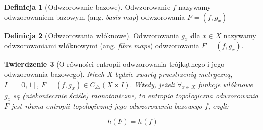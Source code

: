 \documentclass[licencjacka]{pwr_wmat_praca_dyplomowa}
\theoremstyle{plain}
\newtheorem{theorem}{Twierdzenie}
\numberwithin{theorem}{chapter}
\theoremstyle{definition}
\numberwithin{theorem}{chapter}
\newtheorem{definition}[theorem]{Definicja}
\begin{document}
\begin{definition}[Odwzorowanie bazowe]
Odwzorowanie $f$ nazywamy odwzorowaniem bazowym (ang. \textit{basis map}) odwzorowania $F = (f, g_x)$
\end{definition}

\begin{definition}[Odwzorowania włóknowe]
Odwzorowania $g_x$ dla $x \in X$ nazywamy odwzorowaniami włóknowymi (ang. \textit{fibre maps}) odwzorowania $F = (f, g_x)$.
\end{definition}


\begin{theorem}[O równości entropii odwzorowania trójkątnego i jego odwzorowania bazowego]
\label{rownosc_entropii_gdy_wlokna_monotoniczne}
Niech $X$ będzie zwartą przestrzenią metryczną, $I = [0, 1]$, $F = (f, g_x) \in C_\triangle(X \times I).$ Wtedy, jeżeli $\forall_{x \in X}$ funkcje włóknowe $g_x$ są (niekoniecznie ściśle) monotoniczne, to entropia topologiczna odwzorowania $F$ jest równa entropii topologicznej jego odwzorowania bazowego $f$, czyli:

$$h(F) = h(f)$$
\end{theorem}
\end{document}
